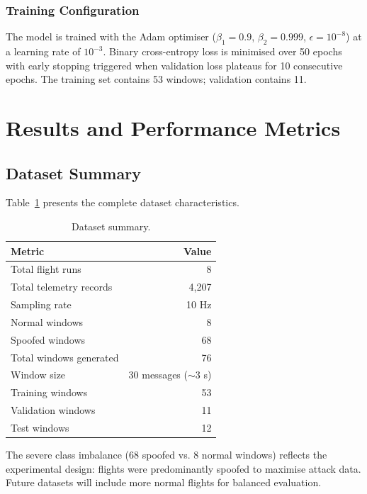 \documentclass[11pt,a4paper]{article}
\begin{document}
\subsubsection{Training Configuration}

The model is trained with the Adam optimiser ($\beta_1 = 0.9$, $\beta_2 = 0.999$, $\epsilon = 10^{-8}$) at a learning rate of $10^{-3}$. Binary cross-entropy loss is minimised over 50 epochs with early stopping triggered when validation loss plateaus for 10 consecutive epochs. The training set contains 53 windows; validation contains 11.

\section{Results and Performance Metrics}

\subsection{Dataset Summary}

Table~\ref{tab:dataset} presents the complete dataset characteristics.

\begin{table}[H]
\centering
\caption{Dataset summary.}
\label{tab:dataset}
\begin{tabular}{@{}lr@{}}
\toprule
\textbf{Metric} & \textbf{Value} \\
\midrule
Total flight runs & 8 \\
Total telemetry records & 4{,}207 \\
Sampling rate & 10 Hz \\
Normal windows & 8 \\
Spoofed windows & 68 \\
Total windows generated & 76 \\
Window size & 30 messages ($\sim$3 s) \\
Training windows & 53 \\
Validation windows & 11 \\
Test windows & 12 \\
\bottomrule
\end{tabular}
\end{table}

The severe class imbalance (68 spoofed vs. 8 normal windows) reflects the experimental design: flights were predominantly spoofed to maximise attack data. Future datasets will include more normal flights for balanced evaluation.
\end{document}
